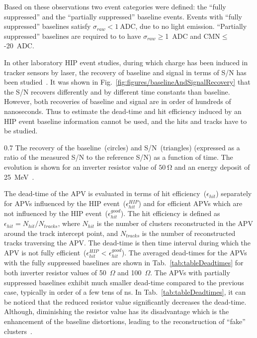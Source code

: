 Based on these observations two event categories were defined: the ``fully suppressed'' and the ``partially suppressed'' baseline events. Events with ``fully suppressed'' baselines satisfy $\sigma_{raw}< 1~\mathrm{ADC}$, due to no light emission. ``Partially suppressed'' baselines are required to to have $\sigma_{raw}\geq$1~ADC and CMN$\leq$-20~ADC.

In other laboratory HIP event studies, during which charge has been induced in tracker sensors by laser, the recovery of baseline and signal in terms of S/N has been studied~\cite{Adam:2005pz}. It was shown in Fig.~\ref{fig:figures/baselineAndSignalRecovery} that the S/N recovers differently and by different time constants than baseline. However, both recoveries of baseline and signal are in order of hundreds of nanoseconds. Thus to estimate the dead-time and hit efficiency induced by an HIP event baseline information cannot be used, and the hits and tracks have to be studied.

                 {0.7}       %
                 {The recovery of the baseline~(circles) and S/N~(triangles) (expressed as a ratio of the measured S/N to the reference S/N) as a function of time. The evolution is shown for an inverter resistor value of $50~\mathrm{\Omega}$ and an energy deposit of 25~MeV~\cite{Adam:2005pz}.} %

The dead-time of the APV is evaluated in terms of hit efficiency~($\epsilon_{hit}$) separately for APVs influenced by the HIP event~($\epsilon_{hit}^{HIP}$) and for efficient APVs which are not influenced by the HIP event~($\epsilon_{hit}^{good}$). The hit efficiency is defined as $\epsilon_{hit} = N_{hit}/N_{tracks}$, where $N_{hit}$ is the number of clusters reconstructed in the APV around the track intercept point, and $N_{tracks}$ is the number of reconstructed tracks traversing the APV. The dead-time is then time interval during which the APV is not fully efficient~($\epsilon_{hit}^{HIP}$ < $\epsilon_{hit}^{good}$). The averaged dead-times for the APVs with the fully suppressed baselines are shown in Tab.~\ref{tab:tableDeadtimes} for both inverter resistor values of 50~$\Omega$ and 100~$\Omega$. The APVs with partially suppressed baselines exhibit much smaller dead-time compared to the previous case, typically in order of a few tens of ns. In Tab.~\ref{tab:tableDeadtimes}, it can be noticed that the reduced resistor value significantly decreases the dead-time. Although, diminishing the resistor value has its disadvantage which is the enhancement of the baseline distortions, leading to the reconstruction of ``fake'' clusters~\cite{Bainbridge:2004jc}.



